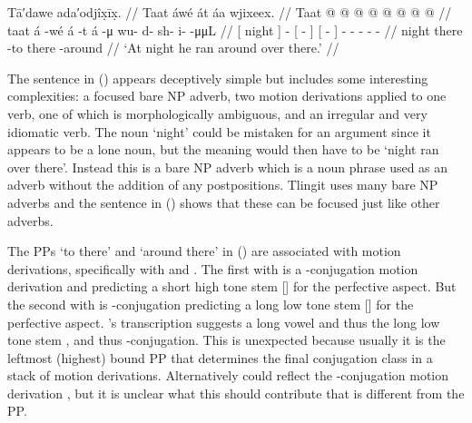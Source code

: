 \ex\label{ex:93-38-ran-around-there}%
%
\begingl
	\glpreamble	Tā′dawe ada′odjîx̣īx̣. //
	\glpreamble	Taat áwé át áa wjixeex. //
	\gla	{} Taat {}  @ {}
		{}  @ {} {}
		{}  @ {} {}
		 @ {} @ {} @ {} @ {} @ {} //
	\glb	{} taat {} á -wé
		{} á -t {}
		{} á -μ {}
		wu- d- sh- i-  -μμL //
	\glc	{}[ night {}]  -
		{}[  - {}]
		{}[  - {}]
		- - - -  - //
	\gld	{} night {}  {}
		{} there -to {}
		{} there -around {}
		 {} {} {} {} {} //
	\glft	‘At night he ran around over there.’
		//
\endgl
\xe

The sentence in (\lastx) appears deceptively simple but includes some interesting complexities: a focused bare NP adverb, two motion derivations applied to one verb, one of which is morphologically ambiguous, and an irregular and very idiomatic verb.
The noun  ‘night’ could be mistaken for an argument since it appears to be a lone noun, but the meaning would then have to be ‘night ran over there’.
Instead this is a bare NP adverb which is a noun phrase used as an adverb without the addition of any postpositions.
Tlingit uses many bare NP adverbs and the sentence in (\lastx) shows that these can be focused just like other adverbs.

The PPs  ‘to there’ and  ‘around there’ in (\lastx) are associated with motion derivations, specifically with  and .
The first with  is a -conjugation motion derivation and predicting a short high tone stem  [] for the perfective aspect.
But the second with  is -conjugation predicting a long low tone stem  [] for the perfective aspect.
\citeauthor{swanton:1909}’s transcription  suggests a long vowel and thus the long low tone stem , and thus -conjugation.
This is unexpected because usually it is the leftmost (highest) bound PP that determines the final conjugation class in a stack of motion derivations.
Alternatively  could reflect the -conjugation motion derivation , but it is unclear what this should contribute that is different from the  PP.

